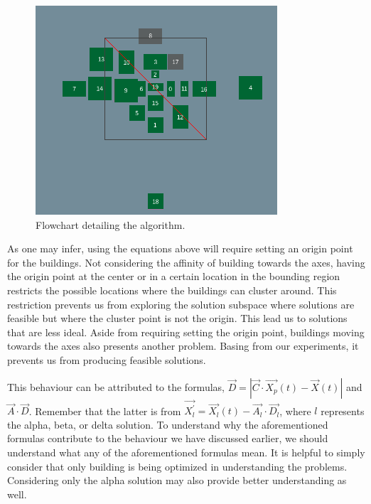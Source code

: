 \begin{figure}[h!]
	\centering
	\includegraphics{./images/chap05-methodology/bad-solution-unmodified-gwo.png}
	\caption{Flowchart detailing the algorithm.}
	\label{bad-solution-unmodified-gwo}
\end{figure}

As one may infer, using the equations above will require setting an origin point for the buildings. Not considering the affinity of building towards the axes, having the origin point at the center or in a certain location in the bounding region restricts the possible locations where the buildings can cluster around. This restriction prevents us from exploring the solution subspace where solutions are feasible but where the cluster point is not the origin. This lead us to solutions that are less ideal. Aside from requiring setting the origin point, buildings moving towards the axes also presents another problem. Basing from our experiments, it prevents us from producing feasible solutions.

This behaviour can be attributed to the formulas, $\vec{D} = \left | \vec{C} \cdot \vec{X_{p}}(t) - \vec{X}(t) \right |$ and $\vec{A} \cdot \vec{D}$. Remember that the latter is from $\vec{X_{l}^{'}} = \vec{X_{l}}(t) - \vec{A_{l}} \cdot \vec{D_{l}}$, where $l$ represents the alpha, beta, or delta solution. To understand why the aforementioned formulas contribute to the behaviour we have discussed earlier, we should understand what any of the aforementioned formulas mean. It is helpful to simply consider that only building is being optimized in understanding the problems. Considering only the alpha solution may also provide better understanding as well.


